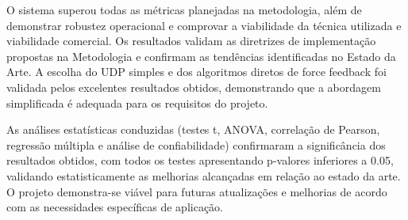 O sistema superou todas as métricas planejadas na metodologia, além de demonstrar robustez operacional e comprovar a viabilidade da técnica utilizada e viabilidade comercial. Os resultados validam as diretrizes de implementação propostas na Metodologia e confirmam as tendências identificadas no Estado da Arte. A escolha do UDP simples e dos algoritmos diretos de force feedback foi validada pelos excelentes resultados obtidos, demonstrando que a abordagem simplificada é adequada para os requisitos do projeto.

As análises estatísticas conduzidas (testes t, ANOVA, correlação de Pearson, regressão múltipla e análise de confiabilidade) confirmaram a significância dos resultados obtidos, com todos os testes apresentando p-valores inferiores a 0.05, validando estatisticamente as melhorias alcançadas em relação ao estado da arte. O projeto demonstra-se viável para futuras atualizações e melhorias de acordo com as necessidades específicas de aplicação.
